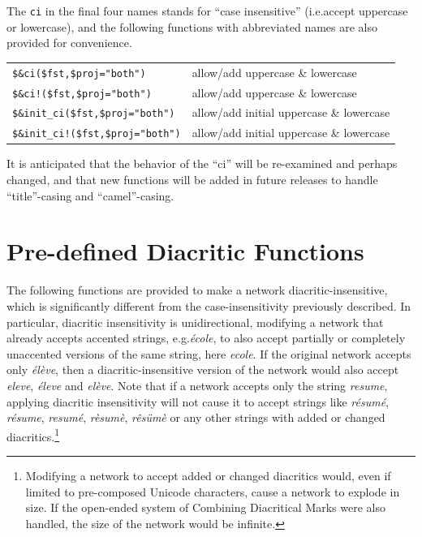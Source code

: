 \documentclass[letterpaper,12pt]{article}
\begin{document}
\vspace{0.5cm}

The \texttt{ci} in the final four names stands for ``case insensitive''
(i.e.\@ accept uppercase or lowercase), and the following functions with
abbreviated names are also provided for convenience.

\vspace{0.5cm}

\noindent
\begin{tabular}{|l|l|}
\hline
\verb/$&ci($fst,/\verb!$proj="both"!\verb!)! & allow/add uppercase \& lowercase\\
\verb/$&ci!($fst,/\verb!$proj="both"!\verb!)! & allow/add uppercase \& lowercase\\
\verb/$&init_ci($fst,/\verb!$proj="both"!\verb!)! & allow/add initial uppercase \& lowercase\\
\verb/$&init_ci!($fst,/\verb!$proj="both"!\verb!)! & allow/add initial uppercase \& lowercase\\
\hline
\end{tabular}

\vspace{0.5cm}

It is anticipated that the behavior of the ``ci'' will be re-examined and
perhaps changed, and that new functions will be added in future releases
to handle ``title''-casing and ``camel''-casing.

\newpage

\section{Pre-defined Diacritic Functions}

The following functions are provided to make a network
diacritic-insensitive, which is significantly different from the
case-insensitivity previously described.  In particular, diacritic
insensitivity is unidirectional, modifying a network that already accepts
accented strings, e.g.\@ \emph{\'ecole}, to also accept partially or
completely unaccented versions of the same string, here \emph{ecole}.  If
the original network accepts only \emph{\'el\`eve}, then a
diacritic-insensitive version of the network would also accept
\emph{eleve}, \emph{\'eleve} and \emph{el\`eve}.  Note that if a network
accepts only the string \emph{resume}, applying diacritic insensitivity
will not cause it to accept strings like \emph{r\'esum\'e},
\emph{r\'esume}, \emph{resum\'e}, \emph{r\`esum\`e}, \emph{r\^es\"um\`e}
or any other strings with added or changed diacritics.\footnote{Modifying
a network to accept added or changed diacritics would, even if limited to
pre-composed Unicode characters, cause a network to explode in size.  If
the open-ended system of Combining Diacritical Marks were also handled,
the size of the network would be infinite.}
\end{document}
